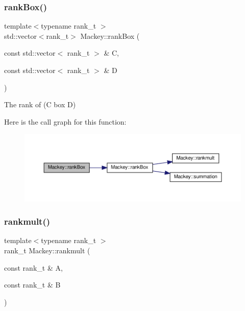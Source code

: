 \subsubsection{\texorpdfstring{rank\+Box()}{rankBox()}\hspace{0.1cm}{\footnotesize\ttfamily [2/2]}}
{\footnotesize\ttfamily template$<$typename rank\+\_\+t $>$ \\
std\+::vector$<$rank\+\_\+t$>$ Mackey\+::rank\+Box (\begin{DoxyParamCaption}\item[{const std\+::vector$<$ rank\+\_\+t $>$ \&}]{C,  }\item[{const std\+::vector$<$ rank\+\_\+t $>$ \&}]{D }\end{DoxyParamCaption})}



The rank of (C box D) 

Here is the call graph for this function\+:\nopagebreak
\begin{figure}[H]
\begin{center}
\leavevmode
\includegraphics[width=350pt]{namespaceMackey_a6ce409eccab63034e324323c1e528814_cgraph}
\end{center}
\end{figure}
\mbox{\label{namespaceMackey_aaa0ce7673970bf261628768fb11a1995}} 
\subsubsection{\texorpdfstring{rankmult()}{rankmult()}}
{\footnotesize\ttfamily template$<$typename rank\+\_\+t $>$ \\
rank\+\_\+t Mackey\+::rankmult (\begin{DoxyParamCaption}\item[{const rank\+\_\+t \&}]{A,  }\item[{const rank\+\_\+t \&}]{B }\end{DoxyParamCaption})}



